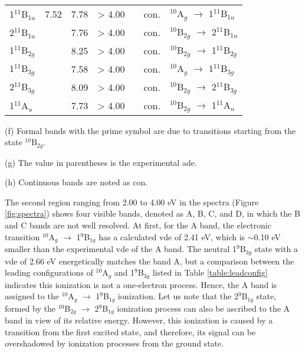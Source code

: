 \begin{refsection}
\begin{table}[htbp!]
\begin{threeparttable}
\begin{tabular}{@{}lllllll@{}}
 1$^{11}$B$_{1u}$    & 7.52    & 7.78   & > 4.00     &        & con. & $^{10}$A$_g$     $\longrightarrow$ 1$^{11}$B$_{1u}$  \\
 2$^{11}$B$_{1u}$    &         & 7.76   & > 4.00     &        & con. & $^{10}$B$_{2g}$  $\longrightarrow$ 2$^{11}$B$_{1u}$  \\
 1$^{11}$B$_{2g}$    &         & 8.25   & > 4.00     &        & con. & $^{10}$B$_{2g}$  $\longrightarrow$ 1$^{11}$B$_{2g}$  \\
 1$^{11}$B$_{3g}$    &         & 7.58   & > 4.00     &        & con. & $^{10}$A$_g$     $\longrightarrow$ 1$^{11}$B$_{3g}$  \\
 2$^{11}$B$_{3g}$    &         & 8.09   & > 4.00     &        & con. & $^{10}$B$_{2g}$  $\longrightarrow$ 2$^{11}$B$_{3g}$  \\
 1$^{11}$A$_{u}$     &         & 7.73   & > 4.00     &        & con. & $^{10}$B$_{2g}$  $\longrightarrow$ 1$^{11}$A$_{u}$  \\ \bottomrule
	\end{tabular}
\begin{tablenotes}
	\item[(f)] Formal bands with the prime symbol are due to transitions starting from the state $^{10}$B$_{2g}$.
	\item[(g)] The value in parentheses is the experimental \acrshort{ade}.
	\item[(h)] Continuous bands are noted as con.
\end{tablenotes}
\end{threeparttable}
\end{table}

  
The second region ranging from 2.00 to 4.00 eV in the spectra (Figure \ref{fig:spectra}) shows four visible bands, denoted as A, B, C, and D, in which the B and C bands are not well resolved. At first, for the A band, the electronic transition $^{10}$A$_g$ $\longrightarrow$ 1$^9$B$_{1g}$ has a calculated \acrshort{vde} of 2.41 eV, which is $\sim$0.10 eV smaller than the experimental \acrshort{vde} of the A band. The neutral 1$^9$B$_{3g}$  state with a \acrshort{vde} of 2.66 eV energetically matches the band A, but a comparison between the leading configurations of $^{10}$A$_g$  and 1$^9$B$_{3g}$ listed in Table \ref{table:leadconfig} indicates this ionization is not a one-electron process. Hence, the A band is assigned to the $^{10}$A$_g$ $\longrightarrow$ 1$^9$B$_{1g}$ ionization. Let us note that the 2$^9$B$_{1g}$ state, formed by the $^{10}$B$_{2g}$ $\longrightarrow$ 2$^9$B$_{1g}$ ionization process can also be ascribed to the A band in view of its relative energy. However, this ionization is caused by a transition from the first excited state, and therefore, its signal can be overshadowed by ionization processes from the ground state.





\end{refsection}
